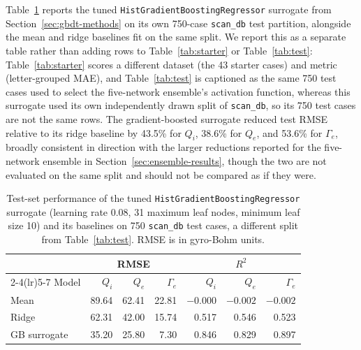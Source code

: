 \documentclass[12pt,letterpaper]{article}
\begin{document}
Table~\ref{tab:gbdt-test} reports the tuned \texttt{HistGradientBoostingRegressor}
surrogate from Section~\ref{sec:gbdt-methods} on its own 750-case
\texttt{scan\_db} test partition, alongside the mean and ridge baselines
fit on the same split. We report this as a separate table rather than adding
rows to Table~\ref{tab:starter} or Table~\ref{tab:test}: Table~\ref{tab:starter}
scores a different dataset (the 43 starter cases) and metric (letter-grouped
MAE), and Table~\ref{tab:test} is captioned as the same 750 test cases used to
select the five-network ensemble's activation function, whereas this
surrogate used its own independently drawn split of \texttt{scan\_db}, so its
750 test cases are not the same rows. The gradient-boosted surrogate reduced
test RMSE relative to its ridge baseline by 43.5\% for $Q_i$, 38.6\% for
$Q_e$, and 53.6\% for $\Gamma_e$, broadly consistent in direction with the
larger reductions reported for the five-network ensemble in
Section~\ref{sec:ensemble-results}, though the two are not evaluated on the
same split and should not be compared as if they were.

\begin{table}[htbp]
  \centering
  \small
  \setlength{\tabcolsep}{5pt}
  \begin{tabular}{lrrrrrr}
    \toprule
                   & \multicolumn{3}{c}{RMSE} & \multicolumn{3}{c}{$R^2$}                                                 \\
    \cmidrule(lr){2-4}\cmidrule(lr){5-7}
    Model          & $Q_i$                    & $Q_e$                     & $\Gamma_e$ & $Q_i$  & $Q_e$  & $\Gamma_e$ \\
    \midrule
    Mean           & 89.64                    & 62.41                     & 22.81      & $-0.000$ & $-0.002$ & $-0.002$ \\
    Ridge          & 62.31                    & 42.00                     & 15.74      & 0.517  & 0.546  & 0.523      \\
    GB surrogate   & 35.20                    & 25.80                     & 7.30       & 0.846  & 0.829  & 0.897      \\
    \bottomrule
  \end{tabular}
  \caption{Test-set performance of the tuned \texttt{HistGradientBoostingRegressor}
    surrogate (learning rate 0.08, 31 maximum leaf nodes, minimum leaf size
    10) and its baselines on 750 \texttt{scan\_db} test cases, a different
    split from Table~\ref{tab:test}. RMSE is in gyro-Bohm units.}
  \label{tab:gbdt-test}
\end{table}
\end{document}
